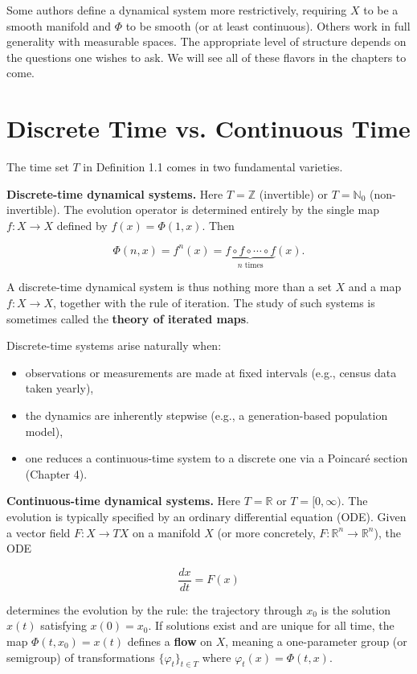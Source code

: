 \begin{remark}
Some authors define a dynamical system more restrictively, requiring $X$ to be a smooth manifold and $\Phi$ to be smooth (or at least continuous). Others work in full generality with measurable spaces. The appropriate level of structure depends on the questions one wishes to ask. We will see all of these flavors in the chapters to come.
\end{remark}


\section{Discrete Time vs. Continuous Time}\label{sec:1.2}

The time set $T$ in Definition 1.1 comes in two fundamental varieties.

\textbf{Discrete-time dynamical systems.} Here $T = \mathbb{Z}$ (invertible) or $T = \mathbb{N}_0$ (non-invertible). The evolution operator is determined entirely by the single map $f: X \to X$ defined by $f(x) = \Phi(1, x)$. Then

\[
\Phi(n, x) = f^n(x) = \underbrace{f \circ f \circ \cdots \circ f}_{n \text{ times}}(x).
\]

A discrete-time dynamical system is thus nothing more than a set $X$ and a map $f: X \to X$, together with the rule of iteration. The study of such systems is sometimes called the \textbf{theory of iterated maps}.

Discrete-time systems arise naturally when:
\begin{itemize}[nosep]
  \item observations or measurements are made at fixed intervals (e.g., census data taken yearly),
  \item the dynamics are inherently stepwise (e.g., a generation-based population model),
  \item one reduces a continuous-time system to a discrete one via a Poincaré section (Chapter 4).
\end{itemize}

\textbf{Continuous-time dynamical systems.} Here $T = \mathbb{R}$ or $T = [0, \infty)$. The evolution is typically specified by an ordinary differential equation (ODE). Given a vector field $F: X \to TX$ on a manifold $X$ (or more concretely, $F: \mathbb{R}^n \to \mathbb{R}^n$), the ODE

\[
\frac{dx}{dt} = F(x)
\]

determines the evolution by the rule: the trajectory through $x_0$ is the solution $x(t)$ satisfying $x(0) = x_0$. If solutions exist and are unique for all time, the map $\Phi(t, x_0) = x(t)$ defines a \textbf{flow} on $X$, meaning a one-parameter group (or semigroup) of transformations $\{\varphi_t\}_{t \in T}$ where $\varphi_t(x) = \Phi(t, x)$.

